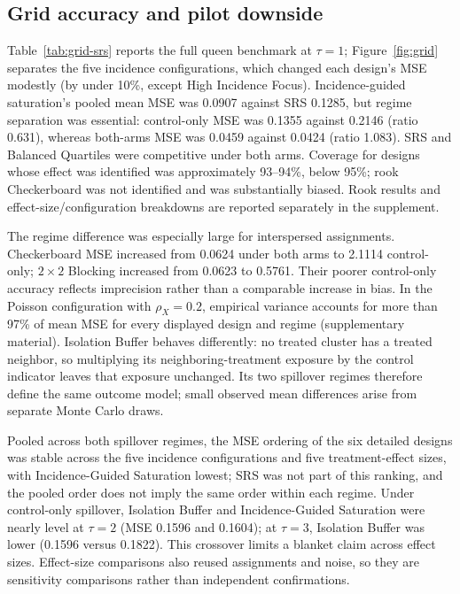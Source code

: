 \documentclass[Afour,sagev,times]{sagej}
\begin{document}
\subsection{Grid accuracy and pilot downside}
Table~\ref{tab:grid-srs} reports the full queen benchmark at $\tau=1$; Figure~\ref{fig:grid} separates the five incidence configurations, which changed each design's MSE modestly (by under 10\%, except High Incidence Focus). Incidence-guided saturation's pooled mean MSE was 0.0907 against SRS 0.1285, but regime separation was essential: control-only MSE was 0.1355 against 0.2146 (ratio 0.631), whereas both-arms MSE was 0.0459 against 0.0424 (ratio 1.083). SRS and Balanced Quartiles were competitive under both arms. Coverage for designs whose effect was identified was approximately 93--94\%, below 95\%; rook Checkerboard was not identified and was substantially biased. Rook results and effect-size/configuration breakdowns are reported separately in the supplement.
\ifctjreading
\CTJGridTable
\CTJGridFigure
\CTJAllocationFigure
\fi

The regime difference was especially large for interspersed assignments. Checkerboard MSE increased from 0.0624 under both arms to 2.1114 control-only; $2\times2$ Blocking increased from 0.0623 to 0.5761. Their poorer control-only accuracy reflects imprecision rather than a comparable increase in bias. In the Poisson configuration with $\rho_X=0.2$, empirical variance accounts for more than 97\% of mean MSE for every displayed design and regime (supplementary material). Isolation Buffer behaves differently: no treated cluster has a treated neighbor, so multiplying its neighboring-treatment exposure by the control indicator leaves that exposure unchanged. Its two spillover regimes therefore define the same outcome model; small observed mean differences arise from separate Monte Carlo draws.

Pooled across both spillover regimes, the MSE ordering of the six detailed designs was stable across the five incidence configurations and five treatment-effect sizes, with Incidence-Guided Saturation lowest; SRS was not part of this ranking, and the pooled order does not imply the same order within each regime. Under control-only spillover, Isolation Buffer and Incidence-Guided Saturation were nearly level at $\tau=2$ (MSE 0.1596 and 0.1604); at $\tau=3$, Isolation Buffer was lower (0.1596 versus 0.1822). This crossover limits a blanket claim across effect sizes. Effect-size comparisons also reused assignments and noise, so they are sensitivity comparisons rather than independent confirmations.
\end{document}
